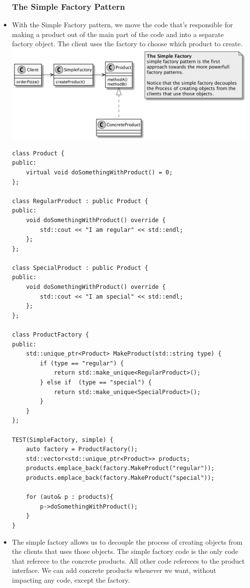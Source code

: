 \documentclass[11pt]{article}
\begin{document}
\begin{itemize}
        \subsubsection{The Simple Factory Pattern}
        \item With the Simple Factory pattern, we move the code that's responsible for making a product out of the main
        part of the code and into a separate factory object. The client uses the factory to choose which product to create.\\
        \includegraphics[scale=0.2]{factories/3__simple_factory_pattern}
        \begin{multicols}{2}
            \begin{lstlisting}
class Product {
public:
    virtual void doSomethingWithProduct() = 0;
};

class RegularProduct : public Product {
public:
    void doSomethingWithProduct() override {
        std::cout << "I am regular" << std::endl;
    };
};

class SpecialProduct : public Product {
public:
    void doSomethingWithProduct() override {
        std::cout << "I am special" << std::endl;
    };
};

class ProductFactory {
public:
    std::unique_ptr<Product> MakeProduct(std::string type) {
        if (type == "regular") {
            return std::make_unique<RegularProduct>();
        } else if  (type == "special") {
            return std::make_unique<SpecialProduct>();
        }
    }
};

TEST(SimpleFactory, simple) {
    auto factory = ProductFactory();
    std::vector<std::unique_ptr<Product>> products;
    products.emplace_back(factory.MakeProduct("regular"));
    products.emplace_back(factory.MakeProduct("special"));

    for (auto& p : products){
        p->doSomethingWithProduct();
    }
}
            \end{lstlisting}
        \end{multicols}
        \item The simple factory allows us to decouple the process of creating objects from the clients that uses those
        objects. The simple factory code is the only code that referece to the concrete products. All other code refereces
        to the product interface. We can add concrete products whenever we want, without impacting any code, except the factory.

\end{itemize}
\end{document}
